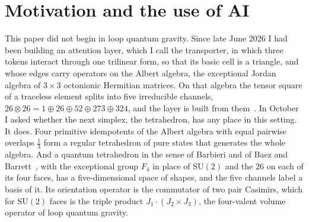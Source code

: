 \section{Motivation and the use of AI}
\label{sec:history}

This paper did not begin in loop quantum gravity. Since late June 2026 I had been
building an attention layer, which I call the transporter, in which three tokens interact
through one trilinear form, so that its basic cell is a triangle, and whose edges carry
operators on the Albert algebra, the exceptional Jordan algebra of $3\times3$ octonionic
Hermitian matrices. On that algebra the tensor square of a traceless element splits into
five irreducible channels, $26\otimes26=1\oplus26\oplus52\oplus273\oplus324$, and the layer
is built from them~\cite{FitchPairChannels}. In October I asked whether the next simplex,
the tetrahedron, has any place in this setting. It does. Four primitive idempotents of the
Albert algebra with equal pairwise overlaps $\frac13$ form a regular tetrahedron of pure
states that generates the whole algebra. And a quantum tetrahedron in the sense of Barbieri
and of Baez and Barrett~\cite{Barbieri1998,BaezBarrett1999}, with the exceptional group
$F_4$ in place of $\mathrm{SU}(2)$ and the $26$ on each of its four faces, has a
five-dimensional space of shapes, and the five channels label a basis of it. Its
orientation operator is the commutator of two pair Casimirs, which for $\mathrm{SU}(2)$
faces is the triple product $J_1\cdot(J_2\times J_3)$, the four-valent volume operator of
loop quantum gravity.

